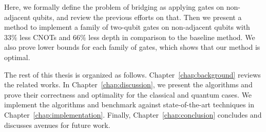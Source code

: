 Here, we formally define the problem of bridging as applying gates on non-adjacent qubits, and review the previous efforts on that. Then we present a method to implement a family of two-qubit gates on non-adjacent qubits with $33\%$ less CNOTs and $66\%$ less depth in comparison to the baseline method. We also prove lower bounds for each family of gates, which shows that our method is optimal.

The rest of this thesis is organized as follows. Chapter~\ref{chap:background} reviews the related works. In Chapter~\ref{chap:discussion}, we present the algorithms and prove their correctness and optimality for the classical and quantum cases. We implement the algorithms and benchmark against state-of-the-art techniques in Chapter~\ref{chap:implementation}. Finally, Chapter~\ref{chap:conclusion} concludes and discusses avenues for future work.
